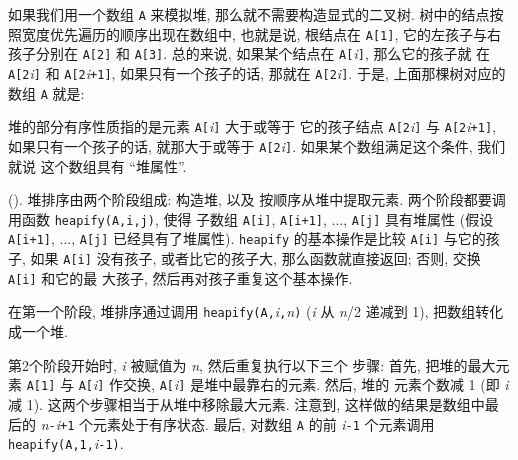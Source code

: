 如果我们用一个数组 \texttt{A} 来模拟堆, 那么就不需要构造显式的二叉树.
树中的结点按照宽度优先遍历的顺序出现在数组中, 也就是说, 根结点在 
\texttt{A[1]}, 它的左孩子与右孩子分别在 \texttt{A[2]} 和 \texttt{A[3]}.
总的来说, 如果某个结点在 \texttt{A[}\textit{i}\texttt{]}, 那么它的孩子就
在 \texttt{A[2}\textit{i}\texttt{]} 和 \texttt{A[2}\textit{i}\texttt{+1]},
如果只有一个孩子的话, 那就在 \texttt{A[2}\textit{i}\texttt{]}.
于是, 上面那棵树对应的数组 \texttt{A} 就是:
\begin{center}
\end{center}

堆的部分有序性质指的是元素 \texttt{A[}\textit{i}\texttt{]} 大于或等于
它的孩子结点 \texttt{A[2}\textit{i}\texttt{]} 与
\texttt{A[2}\textit{i}\texttt{+1]}, 如果只有一个孩子的话, 就那大于或等于
\texttt{A[2}\textit{i}\texttt{]}. 如果某个数组满足这个条件, 我们就说
这个数组具有 ``堆属性''.

 (). 堆排序由两个阶段组成: 构造堆, 以及 
按顺序从堆中提取元素. 两个阶段都要调用函数 \texttt{heapify(A,i,j)}, 使得
子数组 \texttt{A[i]}, \texttt{A[i+1]}, ..., \texttt{A[j]} 具有堆属性 (假设 
\texttt{A[i+1]}, ..., \texttt{A[j]} 已经具有了堆属性). \texttt{heapify}
的基本操作是比较 \texttt{A[i]} 与它的孩子, 如果 \texttt{A[i]} 没有孩子,
或者比它的孩子大, 那么函数就直接返回; 否则, 交换 \texttt{A[i]} 和它的最
大孩子, 然后再对孩子重复这个基本操作.

在第一个阶段, 堆排序通过调用
\texttt{heapify(A,}\textit{i}\texttt{,}\textit{n}\texttt{)} (\textit{i} 从
\textit{n}/2 递减到 1), 把数组转化成一个堆.

第2个阶段开始时, \textit{i} 被赋值为 \textit{n}, 然后重复执行以下三个
步骤: 首先, 把堆的最大元素 \texttt{A[1]} 与 \texttt{A[}\textit{i}\texttt{]}
作交换, \texttt{A[}\textit{i}\texttt{]} 是堆中最靠右的元素. 然后, 堆的 
元素个数减 1 (即 \textit{i} 减 1). 这两个步骤相当于从堆中移除最大元素.
注意到, 这样做的结果是数组中最后的
\textit{n}\texttt{-}\textit{i}\texttt{+1} 个元素处于有序状态. 最后,
对数组 \texttt{A} 的前 \textit{i}\texttt{-1} 个元素调用
\texttt{heapify(A,1,}\textit{i}\texttt{-1)}.

